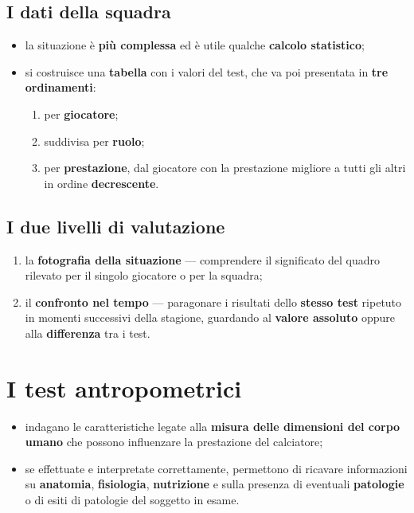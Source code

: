 \subsection{I dati della squadra}

\begin{itemize}
  \item la situazione è \textbf{più complessa} ed è utile qualche \textbf{calcolo statistico};
  \item si costruisce una \textbf{tabella} con i valori del test, che va poi presentata in
    \textbf{tre ordinamenti}:
    \begin{enumerate}
      \item per \textbf{giocatore};
      \item suddivisa per \textbf{ruolo};
      \item per \textbf{prestazione}, dal giocatore con la prestazione migliore a tutti gli altri in
        ordine \textbf{decrescente}.
    \end{enumerate}
\end{itemize}

\subsection{I due livelli di valutazione}

\begin{enumerate}
  \item la \textbf{fotografia della situazione} --- comprendere il significato del quadro rilevato
    per il singolo giocatore o per la squadra;
  \item il \textbf{confronto nel tempo} --- paragonare i risultati dello \textbf{stesso test}
    ripetuto in momenti successivi della stagione, guardando al \textbf{valore assoluto} oppure alla
    \textbf{differenza} tra i test.
\end{enumerate}

\section{I test antropometrici}

\begin{itemize}
  \item indagano le caratteristiche legate alla \textbf{misura delle dimensioni del corpo umano} che
    possono influenzare la prestazione del calciatore;
  \item se effettuate e interpretate correttamente, permettono di ricavare informazioni su
    \textbf{anatomia}, \textbf{fisiologia}, \textbf{nutrizione} e sulla presenza di eventuali
    \textbf{patologie} o di esiti di patologie del soggetto in esame.
\end{itemize}


